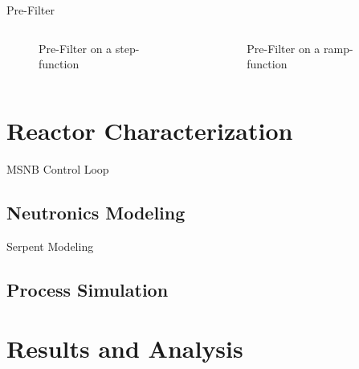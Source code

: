 \documentclass[aspectratio=169,pdftex,dvipsnames]{beamer}
\begin{document}
\begin{frame}{Pre-Filter}
    \begin{columns}
        \begin{column}{0.5\textwidth}
            \begin{figure}
                \resizebox{\textwidth}{!}{}
                \caption{Pre-Filter on a step-function}
            \end{figure}
        \end{column}
        \begin{column}{0.5\textwidth}
            \begin{figure}
                \resizebox{\textwidth}{!}{}
                \caption{Pre-Filter on a ramp-function}
            \end{figure}
        \end{column}
    \end{columns}
\end{frame}

\section{Reactor Characterization}
\begin{frame}{MSNB Control Loop}
    \begin{figure}[!ht]
        \centering
        \resizebox{\textwidth}{!}{}
    \end{figure}
\end{frame}

\subsection{Neutronics Modeling}
\begin{frame}{Serpent Modeling}
    \begin{figure}[!ht]
        \centering
        \resizebox{\textwidth}{!}{}
    \end{figure}
\end{frame}


\subsection{Process Simulation}


\section{Results and Analysis}
\end{document}
